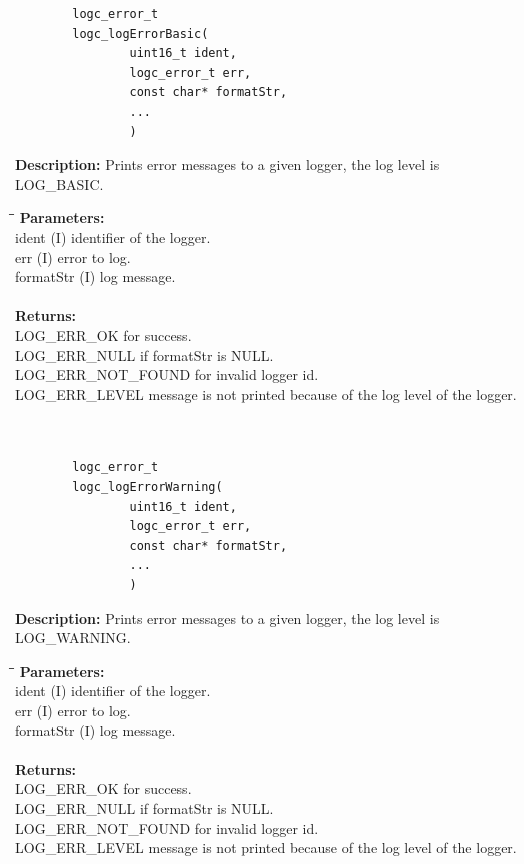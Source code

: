 \documentclass[a4paper, titlepage, 11pt]{article}
\begin{document}
\small
\begin{verbatim}
        logc_error_t
        logc_logErrorBasic(
                uint16_t ident,
                logc_error_t err,
                const char* formatStr,
                ...
                )
\end{verbatim}
\normalsize
\textbf{Description:} Prints error messages to a given logger, the log level is LOG\_BASIC.
\begin{tabbing}
\hspace*{1cm}\=\hspace*{2cm}\=\hspace*{0,6cm}\= \kill
\textbf{Parameters:} \\
\> ident \> (I) identifier of the logger. \\
\> err \> (I) error to log. \\
\> formatStr \> (I) log message. \\ \\
\textbf{Returns:} \\
\> LOG\_ERR\_OK for success. \\
\> LOG\_ERR\_NULL if formatStr is NULL. \\
\> LOG\_ERR\_NOT\_FOUND for invalid logger id. \\
\> LOG\_ERR\_LEVEL message is not printed because of the log level of the logger. \\ \\ \\
\end{tabbing}

\small
\begin{verbatim}
        logc_error_t
        logc_logErrorWarning(
                uint16_t ident,
                logc_error_t err,
                const char* formatStr,
                ...
                )
\end{verbatim}
\normalsize
\textbf{Description:} Prints error messages to a given logger, the log level is LOG\_WARNING.
\begin{tabbing}
\hspace*{1cm}\=\hspace*{2cm}\=\hspace*{0,6cm}\= \kill
\textbf{Parameters:} \\
\> ident \> (I) identifier of the logger. \\
\> err \> (I) error to log. \\
\> formatStr \> (I) log message. \\ \\
\textbf{Returns:} \\
\> LOG\_ERR\_OK for success. \\
\> LOG\_ERR\_NULL if formatStr is NULL. \\
\> LOG\_ERR\_NOT\_FOUND for invalid logger id. \\
\> LOG\_ERR\_LEVEL message is not printed because of the log level of the logger. \\
\end{tabbing}
\end{document}
